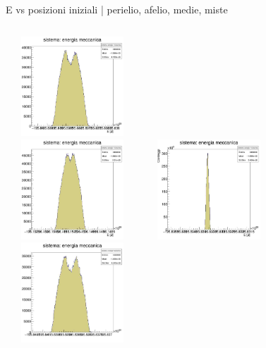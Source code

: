         \begin{frame}{E vs posizioni iniziali | perielio, afelio, medie, miste}
            \begin{columns}
                    \centering        
                    \includegraphics[width=5cm,height=3.75cm]{4_energia/E_500_peri.jpg}\\
                    \includegraphics[width=5cm,height=3.75cm]{4_energia/E_500_afe.jpg}
                    \label{cfr::E4T}              
                    \centering        
                    \includegraphics[width=5cm,height=3.75cm]{4_energia/E_500_medi.jpg}\\
                    \includegraphics[width=5cm,height=3.75cm]{4_energia/E_500_3600.jpg}
                    \label{cfr::E6T}      
            \end{columns}
        \end{frame}

